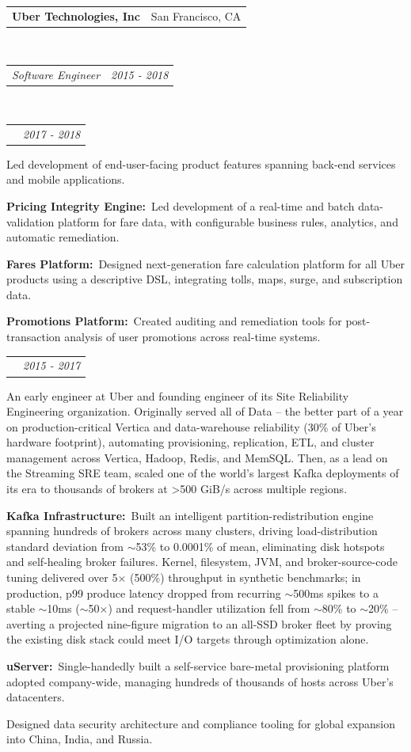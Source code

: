 \documentclass[11pt,letterpaper]{article}
\makeatletter
\newcommand{\area}[2]{{\bfseries\color{accent}#1:}~#2}
\newcommand{\headerrow}[2]{%
  \begin{tabular*}{\linewidth}{@{}l@{\extracolsep{\fill}}r@{}}#1 & #2\end{tabular*}}
\newcommand{\subemployment}[3]{%
  \headerrow{\hspace{6pt}{\bfseries\itshape\color{accent}#1}}{\color{muted}\itshape #2}
  \begin{itemize*}
    \item #3
  \end{itemize*}
}
\newcommand{\employmentNoList}[5]{%
  \headerrow{\textbf{#1}}{\color{muted}#2}\\
  \headerrow{{\itshape\color{accent}#3}}{\color{muted}\itshape #4}
  #5
}
\makeatother
\begin{document}
\employmentNoList{Uber Technologies, Inc}{San Francisco, CA}{Software Engineer}{2015 - 2018}{
  \\[4pt]
 \subemployment{Marketplace Engineering // Fares}{2017 - 2018}{
 Led development of end-user-facing product features spanning back-end services and mobile applications.
\item \area{Pricing Integrity Engine}{Led development of a real-time and batch data-validation platform for fare data, with configurable business rules, analytics, and automatic remediation.}
\item \area{Fares Platform}{Designed next-generation fare calculation platform for all Uber products using a descriptive DSL, integrating tolls, maps, surge, and subscription data.}
\item \area{Promotions Platform}{Created auditing and remediation tools for post-transaction analysis of user promotions across real-time systems.}
}

\subemployment
{Site Reliability Engineering}{2015 - 2017}{
An early engineer at Uber and founding engineer of its Site Reliability Engineering organization. Originally served all of Data -- the better part of a year on production-critical Vertica and data-warehouse reliability (30\% of Uber's hardware footprint), automating provisioning, replication, ETL, and cluster management across Vertica, Hadoop, Redis, and MemSQL. Then, as a lead on the Streaming SRE team, scaled one of the world's largest Kafka deployments of its era to thousands of brokers at >500 GiB/s across multiple regions.
\item \area{Kafka Infrastructure}{Built an intelligent partition-redistribution engine spanning hundreds of brokers across many clusters, driving load-distribution standard deviation from $\sim$53\% to 0.0001\% of mean, eliminating disk hotspots and self-healing broker failures. Kernel, filesystem, JVM, and broker-source-code tuning delivered over 5$\times$ (500\%) throughput in synthetic benchmarks; in production, p99 produce latency dropped from recurring $\sim$500ms spikes to a stable $\sim$10ms ($\sim$50$\times$) and request-handler utilization fell from $\sim$80\% to $\sim$20\% -- averting a projected nine-figure migration to an all-SSD broker fleet by proving the existing disk stack could meet I/O targets through optimization alone.}
\item \area{uServer}{Single-handedly built a self-service bare-metal provisioning platform adopted company-wide, managing hundreds of thousands of hosts across Uber's datacenters.}
\item Designed data security architecture and compliance tooling for global expansion into China, India, and Russia.
}
}
\end{document}
